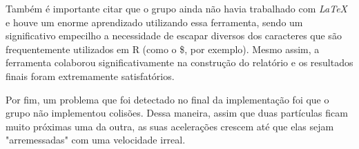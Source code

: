 \documentclass[rel_mlp]{iiufrgs}
\begin{document}
Também é importante citar que o grupo ainda não havia trabalhado com \textit{LaTeX} e
houve um enorme aprendizado utilizando essa ferramenta, sendo um significativo empecilho a necessidade de
escapar diversos dos caracteres que são frequentemente utilizados em R (como o {\$}, por exemplo). Mesmo
assim, a ferramenta colaborou significativamente na construção do relatório e os resultados finais foram
extremamente satisfatórios.

Por fim, um problema que foi detectado no final da implementação foi que o grupo não implementou colisões.
Dessa maneira, assim que duas partículas ficam muito próximas uma da outra, as suas acelerações crescem até que elas sejam "arremessadas"
com uma velocidade irreal.


%



\end{document}
